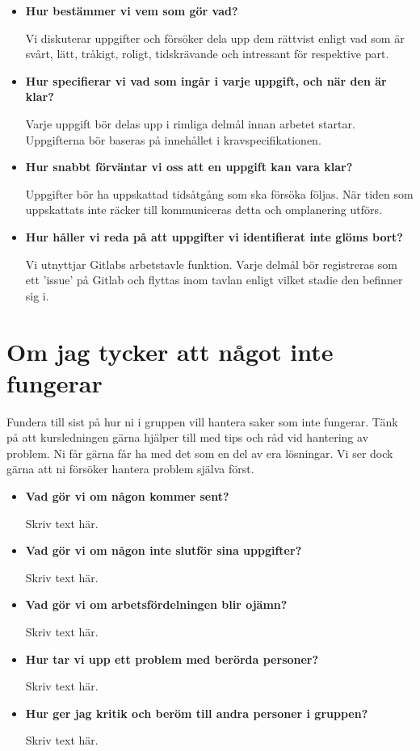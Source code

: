 \documentclass{mall}
\begin{document}
\begin{itemize}
\item \textbf{Hur bestämmer vi vem som gör vad?}

  Vi diskuterar uppgifter och försöker dela upp dem rättvist enligt vad som är svårt, lätt, tråkigt, roligt, tidskrävande och intressant för respektive part.

\item \textbf{Hur specifierar vi vad som ingår i varje uppgift, och när den är klar?}

  Varje uppgift bör delas upp i rimliga delmål innan arbetet startar. Uppgifterna bör baseras på innehållet i kravspecifikationen.

\item \textbf{Hur snabbt förväntar vi oss att en uppgift kan vara klar?}

  Uppgifter bör ha uppskattad tidsåtgång som ska försöka följas. När tiden som uppskattats inte räcker till kommuniceras detta och omplanering utförs.

\item \textbf{Hur håller vi reda på att uppgifter vi identifierat inte glöms bort?}

  Vi utnyttjar Gitlabs arbetstavle funktion. Varje delmål bör registreras som ett 'issue' på Gitlab och flyttas inom tavlan enligt vilket stadie den befinner sig i.

\end{itemize}

\section{Om jag tycker att något inte fungerar}


Fundera till sist på hur ni i gruppen vill hantera saker som inte fungerar. Tänk på att
kursledningen gärna hjälper till med tips och råd vid hantering av problem. Ni får gärna får ha
med det som en del av era lösningar. Vi ser dock gärna att ni försöker hantera problem själva först.

\begin{itemize}
\item \textbf{Vad gör vi om någon kommer sent?}

  Skriv text här.

\item \textbf{Vad gör vi om någon inte slutför sina uppgifter?}

  Skriv text här.

\item \textbf{Vad gör vi om arbetsfördelningen blir ojämn?}

  Skriv text här.

\item \textbf{Hur tar vi upp ett problem med berörda personer?}

  Skriv text här.

\item \textbf{Hur ger jag kritik och beröm till andra personer i gruppen?}

  Skriv text här.

\end{itemize}
\end{document}
